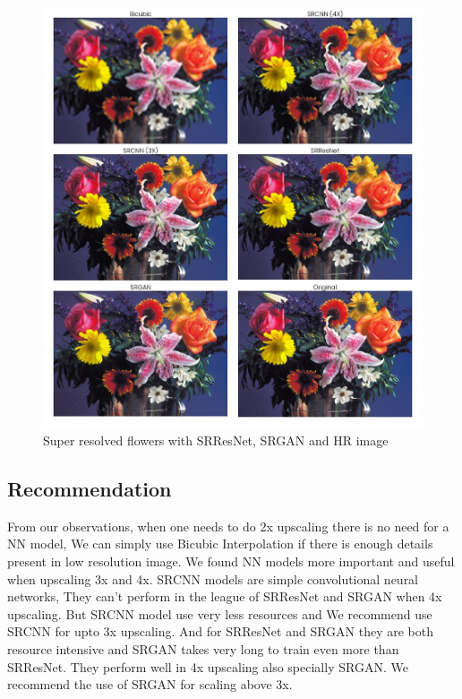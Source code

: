     \newpage
    \begin{figure}
        \centering
        \includegraphics[width=5.5in]{./figures/examples/flowers.jpg}
        \caption{Super resolved flowers  with SRResNet, SRGAN and HR image}
    \end{figure}       
  
\clearpage
\newpage
\subsection{Recommendation}
From our observations, when one needs to do 2x upscaling there is no need for a NN model, We can simply use Bicubic Interpolation if there is enough details present in low resolution image. We found NN models more important and useful when upscaling 3x and 4x. SRCNN models are simple convolutional neural networks, They can't perform in the league of SRResNet and SRGAN when 4x upscaling. But SRCNN model use very less resources and We recommend use SRCNN for upto 3x upscaling. And for SRResNet and SRGAN they are both resource intensive and SRGAN takes very long to train even more than SRResNet. They perform well in 4x upscaling also specially SRGAN. We recommend the use of SRGAN for scaling above 3x.
